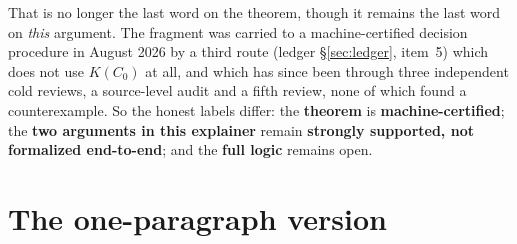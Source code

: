 \documentclass[11pt]{article}
\begin{document}
That is no longer the last word on the theorem, though it remains the last
word on \emph{this} argument. The fragment was carried to a machine-certified
decision procedure in August 2026 by a third route (ledger
\S\ref{sec:ledger}, item~5) which does not use $K(C_0)$ at all, and which has
since been through three independent cold reviews, a source-level audit and a
fifth review, none of which found a counterexample.
So the honest labels differ: the \textbf{theorem} is
\textbf{machine-certified}; the \textbf{two arguments in this explainer}
remain \textbf{strongly supported, not formalized end-to-end}; and the
\textbf{full logic} remains open.

\section{The one-paragraph version}\label{sec:summary}
\end{document}
